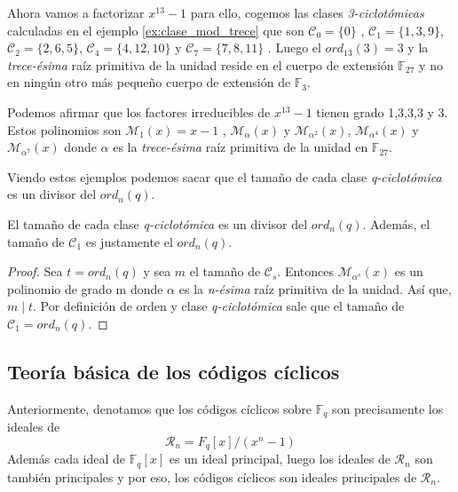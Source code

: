\begin{exampleth}
Ahora vamos a factorizar $x^{13}-1$ para ello, cogemos las clases \textit{3-ciclotómicas} calculadas en el ejemplo \ref{ex:clase_mod_trece} que son $\mathcal{C}_0 = \{ 0 \}$ , $\mathcal{C}_1 = \{ 1,3,9 \}$, $\mathcal{C}_2 = \{ 2,6,5 \}$,  $\mathcal{C}_4 = \{ 4,12,10 \}$ y  $\mathcal{C}_7 = \{ 7,8,11 \}$ . Luego el $ord_{13}(3) = 3$ y la \textit{trece-ésima} raíz primitiva de la unidad reside en el cuerpo de extensión $\mathbb{F}_{27}$ y no en ningún otro más pequeño cuerpo de extensión de $\mathbb{F}_3$.

Podemos afirmar que los factores irreducibles de $x^{13}-1$ tienen grado 1,3,3,3 y 3. Estos polinomios son $\mathcal{M}_{1}(x) = x -1 $ , $\mathcal{M}_{\alpha}(x)$ y $\mathcal{M}_{\alpha^2}(x)$,  $\mathcal{M}_{\alpha^4}(x)$ y  $\mathcal{M}_{\alpha^7}(x)$ donde $\alpha$ es la \textit{trece-ésima} raíz primitiva de la unidad en $\mathbb{F}_{27}$. 


\end{exampleth}
 
Viendo estos ejemplos podemos sacar que el tamaño de cada clase \textit{q-ciclotómica} es un divisor del $ord_n(q)$.

\begin{theorem}
\label{th:tamaño_ciclotomicos}
El tamaño de cada clase \textit{q-ciclotómica} es un divisor del $ord_n(q)$. Además, el tamaño de $\mathcal{C}_1$ es justamente el  $ord_n(q)$.
\end{theorem}

\begin{proof}
Sea $t = ord_n(q)$ y sea $m$ el tamaño de $\mathcal{C}_s$. Entonces $\mathcal{M}_{\alpha^s}(x)$ es un polinomio de grado m donde $\alpha$ es la \textit{n-ésima} raíz primitiva de la unidad. Así que, $ m \mid t$. Por definición de orden y clase \textit{q-ciclotómica} sale que el tamaño de $\mathcal{C}_1 = ord_n(q) $.
\end{proof}


\subsection{Teoría básica de los códigos cíclicos}

Anteriormente, denotamos que los códigos cíclicos sobre $\mathbb{F}_q$ son precisamente los ideales de 
\[
\mathcal{R}_n = F_q[x]/(x^n-1)
\] 
Además cada ideal de $\mathbb{F}_q[x]$ es un ideal principal, luego los ideales de $\mathcal{R}_n$ son también principales y por eso, los códigos cíclicos son ideales principales de $\mathcal{R}_n$.

